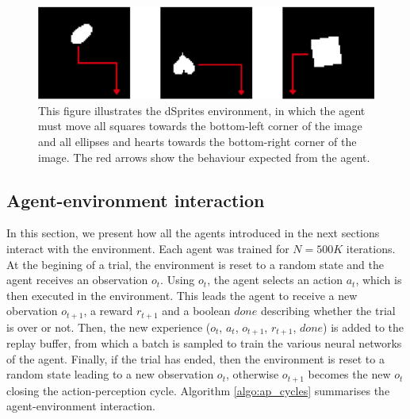 \documentclass[twoside,11pt]{article}
\begin{document}
\begin{figure}[h]
	\begin{center}
	\includegraphics[scale=1.5]{dSprites_env}
	\end{center}
  \caption{This figure illustrates the dSprites environment, in which the agent must move all squares towards the bottom-left corner of the image and all ellipses and hearts towards the bottom-right corner of the image. The red arrows show the behaviour expected from the agent.}
   \label{fig:dSprites_env}
\end{figure}

\subsection{Agent-environment interaction} \label{ssec:env_agent_iter}

In this section, we present how all the agents introduced in the next sections interact with the environment. Each agent was trained for $N = 500K$ iterations. At the begining of a trial, the environment is reset to a random state and the agent receives an observation $o_t$. Using $o_t$, the agent selects an action $a_t$, which is then executed in the environment. This leads the agent to receive a new obervation $o_{t+1}$, a reward $r_{t+1}$ and a boolean $done$ describing whether the trial is over or not. Then, the new experience ($o_t$, $a_t$, $o_{t+1}$, $r_{t+1}$, $done$) is added to the replay buffer, from which a batch is sampled to train the various neural networks of the agent. Finally, if the trial has ended, then the environment is reset to a random state leading to a new observation $o_t$, otherwise $o_{t+1}$ becomes the new $o_t$ closing the action-perception cycle. Algorithm \ref{algo:ap_cycles} summarises the agent-environment interaction.
\end{document}
